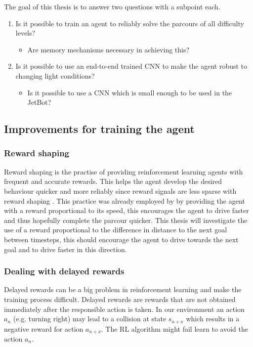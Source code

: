 The goal of this thesis is to answer two questions with a subpoint each.
\begin{enumerate}
     \item Is it possible to train an agent to reliably solve the parcours of all difficulty levels?
     \begin{itemize}
          \item Are memory mechanisms necessary in achieving this?
     \end{itemize}
     \item Is it possible to use an end-to-end trained CNN to make the agent robust to changing light conditions?
     \begin{itemize}
          \item Is it possible to use a CNN which is small enough to be used in the JetBot?
     \end{itemize}
  \end{enumerate}

\subsection{Improvements for training the agent}

\subsubsection{Reward shaping}

Reward shaping is the practise of providing reinforcement learning agents with frequent and accurate rewards. This helps the agent develop the desired behaviour quicker and more reliably since reward signals are less sparse with reward shaping \autocite{drl_for_ad}. This practice was already employed by \autocite{maximilian} by providing the agent with a reward proportional to its speed, this encourages the agent to drive faster and thus hopefully complete the parcour quicker. This thesis will investigate the use of a reward proportional to the difference in distance to the next goal between timesteps, this should encourage the agent to drive towards the next goal and to drive faster in this direction.


\subsubsection{Dealing with delayed rewards}
Delayed rewards can be a big problem in reinforcement learning and make the training process difficult. Delayed rewards are rewards that are not obtained immediately after the responsible action is taken. In our environment an action \(a_n\) (e.g. turning right) may lead to a collision at state \(s_{n+x}\) which results in a negative reward for action \(a_{n+x}\). The RL algorithm might fail learn to avoid the action \(a_n\).

